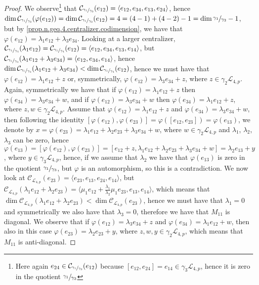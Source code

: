 \documentclass[12pt]{article}
\begin{document}
\begin{proof}
We observe\footnote{Here again $e_{24}\in\mathcal{C}_{\sfrac{\gamma_1}{\gamma_3}}(e_{12})$ because $[e_{12},e_{24}]=e_{14}\in\gamma_3\mathcal{L}_{4,p}$, hence it is zero in the quotient $\sfrac{\gamma_1}{\gamma_3}$} that $\mathcal{C}_{\sfrac{\gamma_1}{\gamma_3}}(e_{12})=\langle e_{12},e_{34},e_{13},e_{24}\rangle$, hence $\dim\mathcal{C}_{\sfrac{\gamma_1}{\gamma_3}}(\varphi(e_{12}))=\dim\mathcal{C}_{\sfrac{\gamma_1}{\gamma_3}}(e_{12})=4=(4-1)+(4-2)-1=\dim\sfrac{\gamma_1}{\gamma_3}-1$, but by \ref{prop.n.geq.4.centralizer.codimension}, we have that $\varphi(e_{12})=\lambda_1 e_{12}+\lambda_3 e_{34}$. Looking at a larger centralizer, $\mathcal{C}_{\sfrac{\gamma_1}{\gamma_4}}(\lambda_1 e_{12})=\mathcal{C}_{\sfrac{\gamma_1}{\gamma_4}}(e_{12})=\langle e_{12},e_{34},e_{13},e_{14}\rangle$, but $\mathcal{C}_{\sfrac{\gamma_1}{\gamma_4}}(\lambda_1 e_{12}+\lambda_3 e_{34})=\langle e_{12},e_{34},e_{14}\rangle$, hence $\dim\mathcal{C}_{\sfrac{\gamma_1}{\gamma_4}}(\lambda_1 e_{12}+\lambda_3 e_{34})<\dim\mathcal{C}_{\sfrac{\gamma_1}{\gamma_4}}(e_{12})$, hence we must have that $\varphi(e_{12})=\lambda_1 e_{12}+z$ or, symmetrically, $\varphi(e_{12})=\lambda_3 e_{34}+z$, where $z\in\gamma_2\mathcal{L}_{4,p}$. Again, symmetrically we have that if $\varphi(e_{12})=\lambda_1 e_{12}+z$ then $\varphi(e_{34})=\lambda_3 e_{34}+w$, and if $\varphi(e_{12})=\lambda_3 e_{34}+w$ then $\varphi(e_{34})=\lambda_1 e_{12}+z$, where $z,w\in\gamma_2\mathcal{L}_{4,p}$. Assume that $\varphi(e_{12})=\lambda_1 e_{12}+z$ and $\varphi(e_{34})=\lambda_3 e_{34}+w$, then following the identity $[\varphi(e_{12}),\varphi(e_{23})]=\varphi([e_{12},e_{23}])=\varphi(e_{13})$, we denote by $x=\varphi(e_{23})=\lambda_1 e_{12}+\lambda_2 e_{23}+\lambda_3 e_{34}+w$, where $w\in\gamma_2\mathcal{L}_{4,p}$ and $\lambda_1$, $\lambda_2$, $\lambda_3$ can be zero, hence $\varphi(e_{13})=[\varphi(e_{12}),\varphi(e_{23})]=[e_{12}+z,\lambda_1 e_{12}+\lambda_2 e_{23}+\lambda_3 e_{34}+w]=\lambda_2 e_{13}+y$, where $y\in\gamma_3\mathcal{L}_{4,p}$, hence, if we assume that $\lambda_2$ we have that $\varphi(e_{13})$ is zero in the quotient $\sfrac{\gamma_1}{\gamma_3}$, but $\varphi$ is an automorphism, so this is a contradiction. We now look at $\mathcal{C}_{\mathcal{L}_{4,p}}(e_{23})=\langle e_{23},e_{13},e_{24},e_{14}\rangle$, but $\mathcal{C}_{\mathcal{L}_{4,p}}(\lambda_1 e_{12}+\lambda_2 e_{23})=\langle \mu_1 e_{12}+\frac{\lambda_1}{\lambda_2}\mu_1 e_{23},e_{13},e_{14}\rangle$, which means that $\dim\mathcal{C}_{\mathcal{L}_{4,p}}(\lambda_1 e_{12}+\lambda_2 e_{23})<\dim\mathcal{C}_{\mathcal{L}_{4,p}}(e_{23})$, hence we must have that $\lambda_1=0$ and symmetrically we also have that $\lambda_3=0$, therefore we have that $M_{11}$ is diagonal. We observe that if $\varphi(e_{12})=\lambda_3 e_{34}+z$ and $\varphi(e_{34})=\lambda_1 e_{12}+w$, then also in this case $\varphi(e_{23})=\lambda_2 e_{23}+y$, where $z,w,y\in\gamma_2\mathcal{L}_{4,p}$, which means that $M_{11}$ is anti-diagonal.
\end{proof}
\end{document}
